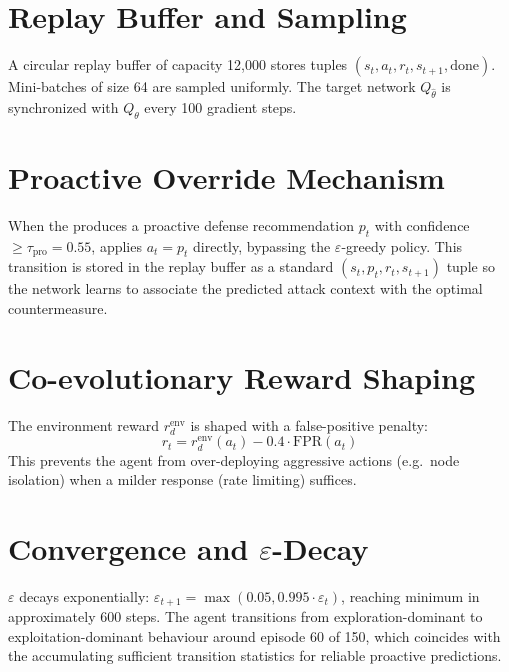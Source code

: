 \section{Replay Buffer and Sampling}

A circular replay buffer of capacity 12,000 stores tuples
$(s_t, a_t, r_t, s_{t+1}, \mathrm{done})$.
Mini-batches of size 64 are sampled uniformly.
The target network $Q_{\hat\theta}$ is synchronized with $Q_\theta$
every 100 gradient steps.

\section{Proactive Override Mechanism}

When the \tagraph{} produces a proactive defense recommendation $p_t$
with confidence $\geq \tau_{\mathrm{pro}} = 0.55$, \adpn{} applies
$a_t = p_t$ directly, bypassing the $\varepsilon$-greedy policy.
This transition is stored in the replay buffer as a standard
$(s_t, p_t, r_t, s_{t+1})$ tuple so the network learns to associate
the predicted attack context with the optimal countermeasure.

\section{Co-evolutionary Reward Shaping}

The environment reward $r_d^{\mathrm{env}}$ is shaped with a
false-positive penalty:
\begin{equation}
  r_t = r_d^{\mathrm{env}}(a_t) - 0.4 \cdot \mathrm{FPR}(a_t)
\end{equation}
This prevents the agent from over-deploying aggressive actions
(e.g.\ node isolation) when a milder response (rate limiting) suffices.

\section{Convergence and $\varepsilon$-Decay}

$\varepsilon$ decays exponentially: $\varepsilon_{t+1} = \max(0.05,
0.995 \cdot \varepsilon_t)$, reaching minimum in approximately
600 steps. The agent transitions from exploration-dominant to
exploitation-dominant behaviour around episode 60 of 150, which
coincides with the \tagraph{} accumulating sufficient transition
statistics for reliable proactive predictions.
